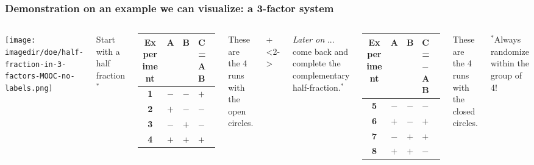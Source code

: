 \begin{frame}\frametitle{Demonstration on an example we can visualize: a 3-factor system}
	\begin{columns}
			\begin{center}
				\texttt{[image: \\imagedir/doe/half-fraction-in-3-factors-MOOC-no-labels.png]}
			\end{center}
			
		
			{\color{blue}Start with a half fraction $^\ast$}
			\begin{tabulary}{\linewidth}{cccl}\hline 
				\textsf{\relax Experiment } & \textbf{\relax A } & \textbf{\relax B } & \textbf{\relax C = AB} \\
				\hline 
				\textbf{1} & \(-\) & \(-\) & \(+\) \\
				\textbf{2} & \(+\) & \(-\) & \(-\) \\
				\textbf{3} & \(-\) & \(+\) & \(-\) \\
				\textbf{4} & \(+\) & \(+\) & \(+\) \\  \hline
			\end{tabulary}
			
			{\color{myOrange}These are the 4 runs with the open circles.}

			\small
			\vspace{0.5cm}
			
			
			\onslide+<2->{
			{\color{blue}\emph{Later on} ... come back and complete the complementary half-fraction.$^\ast$}
			
			\begin{tabulary}{\linewidth}{cccl}\hline 
				\textsf{\relax Experiment } & \textbf{\relax A } & \textbf{\relax B } & \textbf{\relax C = $-$AB } \\
				\hline 
				\textbf{5} & \(-\) & \(-\) & \(-\) \\
				\textbf{6} & \(+\) & \(-\) & \(+\) \\
				\textbf{7} & \(-\) & \(+\) & \(+\) \\
				\textbf{8} & \(+\) & \(+\) & \(-\) \\ \hline
			\end{tabulary}
			
			{\color{myOrange}These are the 4 runs with the closed circles.}
			}
			
			\vspace{6pt}
			{\color{blue}$^\ast$\scriptsize {Always randomize within the group of 4!}}
	\end{columns}
\end{frame}

